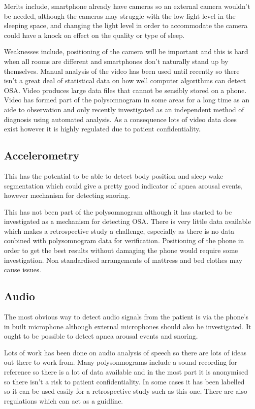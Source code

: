 Merits include, smartphone already have cameras so an external camera wouldn’t be needed, although the cameras may struggle with the low light level in the sleeping space, and changing the light level in order to accommodate the camera could have a knock on effect on the quality or type of sleep. 

Weaknesses include, positioning of the camera will be important and this is hard when all rooms are different and smartphones don’t naturally stand up by themselves. Manual analysis of the video has been used until recently so there isn’t a great deal of statistical data on how well computer algorithms can detect OSA. Video produces large data files that cannot be sensibly stored on a phone. Video has formed part of the polysomnogram in some areas for a long time as an aide to observation and only recently investigated as an independent method of diagnosis using automated analysis. As a consequence lots of video data does exist however it is highly regulated due to patient confidentiality. 

\subsection{Accelerometry}
This has the potential to be able to detect body position and sleep wake segmentation which could give a pretty good indicator of apnea arousal events, however mechanism for detecting snoring.

This has not been part of the polysomnogram although it has started to be investigated as a mechanism for detecting OSA. There is very little data available which makes a retrospective study a challenge, especially as there is no data conbined with polysomnogram data for verification. Positioning of the phone in order to get the best results without damaging the phone would require some investigation. Non standardised arrangements of mattress and bed clothes may cause issues. 

\subsection{Audio}
The most obvious way to detect audio signals from the patient is via the phone’s in built microphone although external microphones should also be investigated. It ought to be possible to detect apnea arousal events and snoring. 

Lots of work has been done on audio analysis of speech so there are lots of ideas out there to work from. Many polysomnograms include a sound recording for reference so there is a lot of data available and in the most part it is anonymised so there isn’t a risk to patient confidentiality. In some cases it has been labelled so it can be used easily for a retrospective study such as this one. There are also regulations which can act as a guidline. 

